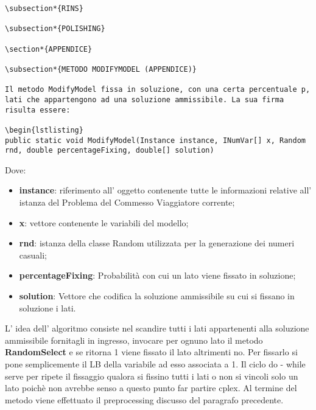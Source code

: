 \documentclass[11pt]{article}
\begin{document}
\begin{lstlisting}
\subsection*{RINS}

\subsection*{POLISHING}

\section*{APPENDICE}

\subsection*{METODO MODIFYMODEL (APPENDICE)}

Il metodo ModifyModel fissa in soluzione, con una certa percentuale p, lati che appartengono ad una soluzione ammissibile. La sua firma risulta essere:

\begin{lstlisting} 
public static void ModifyModel(Instance instance, INumVar[] x, Random rnd, double percentageFixing, double[] solution)
\end{lstlisting}

Dove:

\begin{itemize}
    \item \textbf{instance}: riferimento all' oggetto contenente tutte le informazioni relative all' istanza del Problema del Commesso Viaggiatore corrente;
    \item \textbf{x}: vettore contenente le variabili del modello;
    \item \textbf{rnd}: istanza della classe Random utilizzata per la generazione dei numeri casuali;
    \item \textbf{percentageFixing}: Probabilità con cui un lato viene fissato in soluzione;
    \item \textbf{solution}: Vettore che codifica la soluzione ammissibile su cui si fissano in soluzione i lati.
\end{itemize}


L' idea dell' algoritmo consiste nel scandire tutti i lati appartenenti alla soluzione ammissibile fornitagli in ingresso, invocare per ognuno lato il metodo \textbf{RandomSelect} e se ritorna 1 viene fissato il lato altrimenti no. Per fissarlo si pone semplicemente il LB della variabile ad esso associata a 1.  Il ciclo do - while serve per ripete il fissaggio qualora si fissino tutti i lati o non si vincoli solo un lato poichè non avrebbe senso a questo punto far partire cplex. Al termine del metodo viene effettuato il preprocessing discusso del paragrafo precedente.
\end{document}

